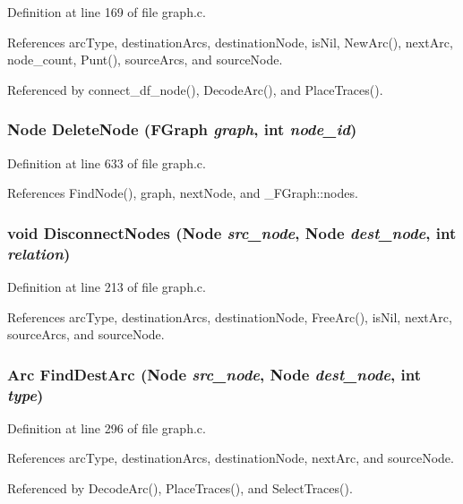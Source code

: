 Definition at line 169 of file graph.c.

References arc\-Type, destination\-Arcs, destination\-Node, is\-Nil, New\-Arc(), next\-Arc, node\_\-count, Punt(), source\-Arcs, and source\-Node.

Referenced by connect\_\-df\_\-node(), Decode\-Arc(), and Place\-Traces().
\subsubsection{\setlength{\rightskip}{0pt plus 5cm}\bf{Node} Delete\-Node (\bf{FGraph} {\em graph}, int {\em node\_\-id})}\label{graph_8h_23212ce3539da4ba88a53d45bb21e247}




Definition at line 633 of file graph.c.

References Find\-Node(), graph, next\-Node, and \_\-FGraph::nodes.
\subsubsection{\setlength{\rightskip}{0pt plus 5cm}void Disconnect\-Nodes (\bf{Node} {\em src\_\-node}, \bf{Node} {\em dest\_\-node}, int {\em relation})}\label{graph_8h_8e3bfa7c3094fd36c7a0d67c2cf7eb8b}




Definition at line 213 of file graph.c.

References arc\-Type, destination\-Arcs, destination\-Node, Free\-Arc(), is\-Nil, next\-Arc, source\-Arcs, and source\-Node.
\subsubsection{\setlength{\rightskip}{0pt plus 5cm}\bf{Arc} Find\-Dest\-Arc (\bf{Node} {\em src\_\-node}, \bf{Node} {\em dest\_\-node}, int {\em type})}\label{graph_8h_32c17ee45b4d7a7a8f5030dbb3dbbfea}




Definition at line 296 of file graph.c.

References arc\-Type, destination\-Arcs, destination\-Node, next\-Arc, and source\-Node.

Referenced by Decode\-Arc(), Place\-Traces(), and Select\-Traces().
